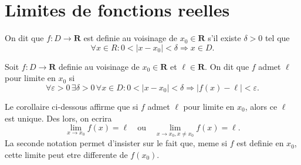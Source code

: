 \section{Limites de fonctions reelles}
\begin{definition}
On dit que $f:D\to \mathbf{R}$ est definie au voisinage de $x_{0}\in \mathbf{R}$ s'il existe $\delta>0$ tel que
$$
\forall x \in R: 0<|x-x_{0}|<\delta \Rightarrow x \in D.
$$
\end{definition}
\begin{definition}
Soit $f:D\to \mathbf{R}$ definie au voisinage de $x_{0}\in \mathbf{R}$ et $\ell \in \mathbf{R}$. On dit que $f$ admet $\ell$ pour limite en $x_{0}$ si
$$
\forall\varepsilon>0\, \exists\delta>0\,\forall x \in D:0<|x-x_{0}|<\delta \Rightarrow |f(x)-\ell|<\varepsilon.
$$
\end{definition}
\begin{notation}
Le corollaire ci-dessous affirme que si $f$ admet $\ell$ pour limite en $x_{0}$, alors ce $\ell$ est unique. Des lors, on ecrira
$$
\lim_{ x \to x_{0} } f(x)=\ell\quad \text{ou}\quad \lim_{ x \to x_{0},x\neq x_{0} } f(x)=\ell.
$$
La seconde notation permet d'insister sur le fait que, meme si $f$ est definie en $x_{0}$, cette limite peut etre differente de $f(x_{0})$.
\end{notation}